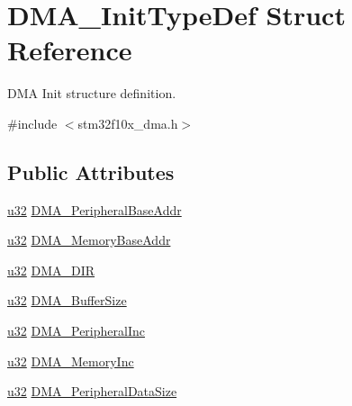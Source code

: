 \hypertarget{struct_d_m_a___init_type_def}{}\section{D\+M\+A\+\_\+\+Init\+Type\+Def Struct Reference}
\label{struct_d_m_a___init_type_def}


D\+MA Init structure definition.  




{\ttfamily \#include $<$stm32f10x\+\_\+dma.\+h$>$}

\subsection*{Public Attributes}
\begin{DoxyCompactItemize}
\item 
\hyperlink{agilefox_2library_2inc_2stm32f10x__type_8h_a2caf5cd7bcdbe1eefa727f44ffb10bac}{u32} \hyperlink{struct_d_m_a___init_type_def_a9721c2839c7744899a3297b3e9bf623e}{D\+M\+A\+\_\+\+Peripheral\+Base\+Addr}
\item 
\hyperlink{agilefox_2library_2inc_2stm32f10x__type_8h_a2caf5cd7bcdbe1eefa727f44ffb10bac}{u32} \hyperlink{struct_d_m_a___init_type_def_a5e260bb85f55c8a4c9d06302ce9ccc4c}{D\+M\+A\+\_\+\+Memory\+Base\+Addr}
\item 
\hyperlink{agilefox_2library_2inc_2stm32f10x__type_8h_a2caf5cd7bcdbe1eefa727f44ffb10bac}{u32} \hyperlink{struct_d_m_a___init_type_def_ac4f02c3e52ba64d558678dd22df044cd}{D\+M\+A\+\_\+\+D\+IR}
\item 
\hyperlink{agilefox_2library_2inc_2stm32f10x__type_8h_a2caf5cd7bcdbe1eefa727f44ffb10bac}{u32} \hyperlink{struct_d_m_a___init_type_def_ad402531bd12f654106223c2c113d678c}{D\+M\+A\+\_\+\+Buffer\+Size}
\item 
\hyperlink{agilefox_2library_2inc_2stm32f10x__type_8h_a2caf5cd7bcdbe1eefa727f44ffb10bac}{u32} \hyperlink{struct_d_m_a___init_type_def_a5da3ba0fe5ae5560cef992c86c129376}{D\+M\+A\+\_\+\+Peripheral\+Inc}
\item 
\hyperlink{agilefox_2library_2inc_2stm32f10x__type_8h_a2caf5cd7bcdbe1eefa727f44ffb10bac}{u32} \hyperlink{struct_d_m_a___init_type_def_a980fa522d1f161bce5d0ebc853cf0c24}{D\+M\+A\+\_\+\+Memory\+Inc}
\item 
\hyperlink{agilefox_2library_2inc_2stm32f10x__type_8h_a2caf5cd7bcdbe1eefa727f44ffb10bac}{u32} \hyperlink{struct_d_m_a___init_type_def_a4419f4e44f37a950ab35a1d0cc9c4b5c}{D\+M\+A\+\_\+\+Peripheral\+Data\+Size}

\end{DoxyCompactItemize}
